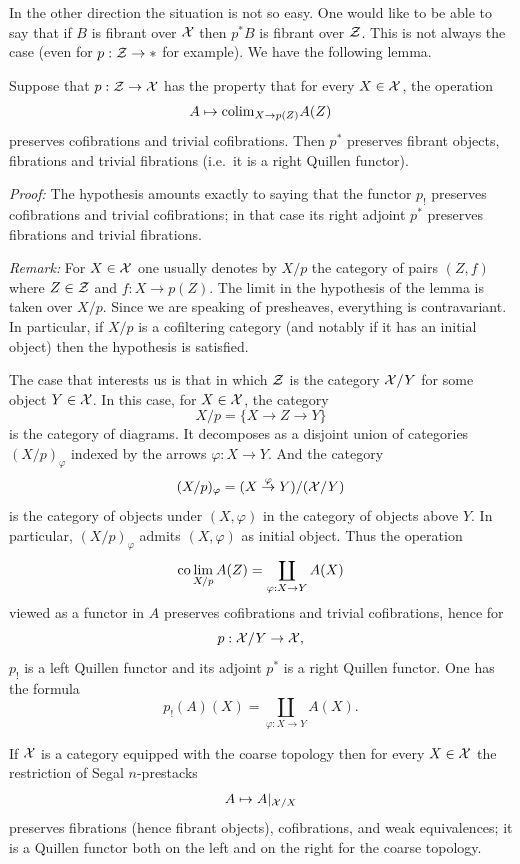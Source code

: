 In the other direction the situation is not so easy. One would like to be able
to say that if $B$ is fibrant over ${\cal X}$ then $p^{\ast}B$ is fibrant over
${\cal Z}$. This is not always the case (even for $p: {\cal Z} \rightarrow \ast$ for
example). We have the following lemma.

\begin{lemma}
\label{shriek}
Suppose that $p: {\cal Z} \rightarrow {\cal X}$ has the property that for every
$X\in {\cal X}$, the operation
$$
A\mapsto {\rm colim}_{ X\rightarrow p(Z)}A(Z)
$$
preserves cofibrations and trivial cofibrations. Then $p^{\ast}$
preserves
fibrant objects, fibrations and trivial fibrations (i.e.\ it is a right
Quillen functor).
\end{lemma}
{\em Proof:}
The hypothesis amounts exactly to saying that the functor $p_!$ preserves
cofibrations and trivial cofibrations; in that case its right adjoint
$p^{\ast}$ preserves fibrations and trivial fibrations.
\eop

{\em Remark:} For $X\in {\cal X}$ one usually denotes by $X/p$ the category of
pairs $(Z,f)$ where $Z\in {\cal Z}$ and $f: X\rightarrow p(Z)$. The limit in the
hypothesis of the lemma is taken over $X/p$. Since we are speaking of
presheaves, everything is contravariant. In particular, if $X/p$ is a
cofiltering category (and notably if it has an initial object) then the
hypothesis is satisfied.

The case that interests us is that in which ${\cal Z}$ is the category ${\cal X} /Y$
for some object $Y\in {\cal X}$. In this case, for $X\in {\cal X}$, the category
$$
X/p = \{  X\rightarrow Z \rightarrow Y\}
$$
is the category of diagrams. It decomposes as a disjoint union of categories
$(X/p)_{\varphi}$ indexed by the arrows $\varphi : X\rightarrow Y$. And the
category
$$
(X/p)_{\varphi} = (X\stackrel{\varphi}{\rightarrow} Y) / ({\cal X} / Y)
$$
is the category of objects under $(X,\varphi )$ in the category of objects
above $Y$. In particular, $(X/p)_{\varphi}$ admits $(X,\varphi )$ as initial
object. Thus the operation
$$
{\rm co}\lim _{X/p} A(Z) = \coprod _{\varphi : X\rightarrow Y} A(X)
$$
viewed as a functor in $A$ preserves cofibrations and trivial cofibrations,
hence for
$$
p: {\cal X} /Y\rightarrow {\cal X} ,
$$
$p_!$ is a left Quillen functor and its adjoint $p^{\ast}$ is a right Quillen
functor. One has the formula
$$
p_!(A) (X) = \coprod _{\varphi : X\rightarrow Y} A(X).
$$

\begin{corollary}
\label{fibrestrict}
If ${\cal X}$ is a category equipped with the coarse topology then for every
$X\in
{\cal X}$ the restriction of Segal $n$-prestacks
$$
A\mapsto A|_{{\cal X} /X}
$$
preserves fibrations (hence fibrant objects), cofibrations, and weak
equivalences; it is a Quillen functor both on the left and on the right for
the coarse topology.
\end{corollary}
\eop

